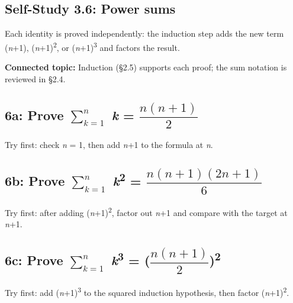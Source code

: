 \documentclass[11pt]{article}
\begin{document}
\begin{keepsection}
\section{Self-Study 3.6: Power sums}

Each identity is proved independently: the induction step adds the new term (\textit{n}+1), (\textit{n}+1)\textsuperscript{2}, or (\textit{n}+1)\textsuperscript{3} and factors the result.

\textbf{Connected topic:} Induction (§2.5) supports each proof; the sum notation is reviewed in §2.4.

\begin{keepsection}
\subsection{6a: Prove $\sum_{{k}=1}^{{n}} $ \textit{k} = {\small\ensuremath{\dfrac{{n}({n}+1)}{2}}}}

Try first: check \textit{n} = 1, then add \textit{n}+1 to the formula at \textit{n}.

\end{keepsection}

\begin{keepsection}
\subsection{6b: Prove $\sum_{{k}=1}^{{n}} $ \textit{k}\textsuperscript{2} = {\small\ensuremath{\dfrac{{n}({n}+1)(2{n}+1)}{6}}}}

Try first: after adding (\textit{n}+1)\textsuperscript{2}, factor out \textit{n}+1 and compare with the target at \textit{n}+1.

\end{keepsection}

\begin{keepsection}
\subsection{6c: Prove $\sum_{{k}=1}^{{n}} $ \textit{k}\textsuperscript{3} = ({\small\ensuremath{\dfrac{{n}({n}+1)}{2}}})\textsuperscript{2}}

Try first: add (\textit{n}+1)\textsuperscript{3} to the squared induction hypothesis, then factor (\textit{n}+1)\textsuperscript{2}.

\end{keepsection}
\end{keepsection}
\end{document}
